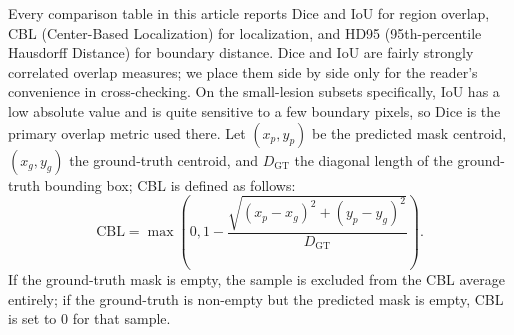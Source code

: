 Every comparison table in this article reports Dice and IoU for region overlap, CBL (Center-Based Localization) for localization, and HD95 (95th-percentile Hausdorff Distance) for boundary distance. Dice and IoU are fairly strongly correlated overlap measures; we place them side by side only for the reader's convenience in cross-checking. On the small-lesion subsets specifically, IoU has a low absolute value and is quite sensitive to a few boundary pixels, so Dice is the primary overlap metric used there. Let $(x_p,y_p)$ be the predicted mask centroid, $(x_g,y_g)$ the ground-truth centroid, and $D_{\mathrm{GT}}$ the diagonal length of the ground-truth bounding box; CBL is defined as follows:
\begin{equation}
\mathrm{CBL}=\max\left(0,1-\frac{\sqrt{(x_p-x_g)^2+(y_p-y_g)^2}}{D_{\mathrm{GT}}}\right).
\end{equation}
If the ground-truth mask is empty, the sample is excluded from the CBL average entirely; if the ground-truth is non-empty but the predicted mask is empty, CBL is set to 0 for that sample.
